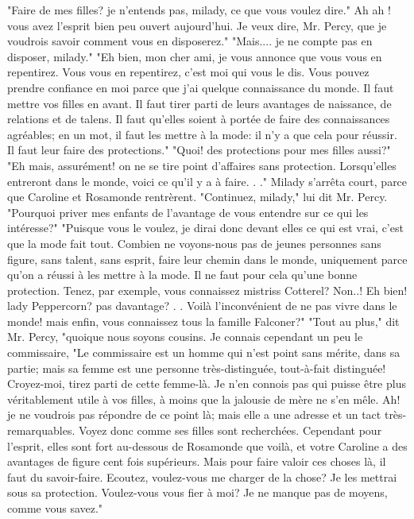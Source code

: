 "Faire de mes filles? je n'entends pas, milady, ce que vous voulez dire."
Ah ah ! vous avez l'esprit bien peu ouvert aujourd'hui. Je veux dire, Mr. Percy, que je voudrois savoir comment vous en disposerez."
"Mais.... je ne compte pas en disposer, milady."
"Eh bien, mon cher ami, je vous annonce que vous vous en repentirez. Vous vous en repentirez, c'est moi qui vous le dis. Vous pouvez prendre confiance en moi parce que j'ai quelque connaissance du monde. Il faut mettre vos filles en avant. Il faut tirer parti de leurs avantages de naissance, de relations et de talens. Il faut qu'elles soient à\setcounter{page}{386} portée de faire des connaissances agréables; en un mot, il faut les mettre à la mode: il n'y a que cela pour réussir. Il faut leur faire des protections."
"Quoi! des protections pour mes filles aussi?"
"Eh mais, assurément! on ne se tire point d'affaires sans protection. Lorsqu'elles entreront dans le monde, voici ce qu'il y a à faire. . ." Milady s'arrêta court, parce que Caroline et Rosamonde rentrèrent.
"Continuez, milady," lui dit Mr. Percy.
"Pourquoi priver mes enfants de l'avantage de vous entendre sur ce qui les intéresse?"
"Puisque vous le voulez, je dirai donc devant elles ce qui est vrai, c'est que la mode fait tout. Combien ne voyons-nous pas de jeunes personnes sans figure, sans talent, sans esprit, faire leur chemin dans le monde, uniquement parce qu'on a réussi à les mettre à la mode. Il ne faut pour cela qu'une bonne protection. Tenez, par exemple, vous connaissez mistriss Cotterel? Non..! Eh bien! lady Peppercorn? pas davantage? . . Voilà l'inconvénient de ne pas vivre dans le monde! mais enfin, vous connaissez tous la famille Falconer?"
"Tout au plus," dit Mr. Percy, "quoique nous soyons cousins. Je connais cependant un peu le commissaire,\setcounter{page}{387} "Le commissaire est un homme qui n’est point sans mérite, dans sa partie; mais sa femme est une personne très-distinguée, tout-à-fait distinguée! Croyez-moi, tirez parti de cette femme-là. Je n’en connois pas qui puisse être plus véritablement utile à vos filles, à moins que la jalousie de mère ne s’en mêle. Ah! je ne voudrois pas répondre de ce point là; mais elle a une adresse et un tact très-remarquables. Voyez donc comme ses filles sont recherchées. Cependant pour l’esprit, elles sont fort au-dessous de Rosamonde que voilà, et votre Caroline a des avantages de figure cent fois supérieurs. Mais pour faire valoir ces choses là, il faut du savoir-faire. Ecoutez, voulez-vous me charger de la chose? Je les mettrai sous sa protection. Voulez-vous vous fier à moi? Je ne manque pas de moyens, comme vous savez."
